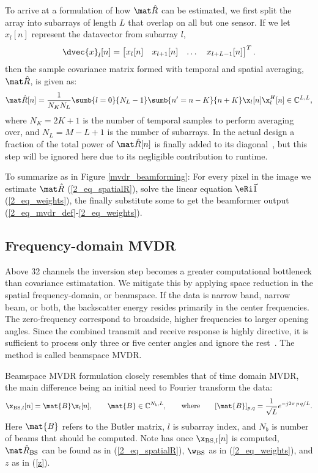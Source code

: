 {To arrive at a formulation of how $\eR$ can be estimated, we first split the array into subarrays of length $L$ that overlap on all but one sensor. If we let $x_l[n]$ represent the datavector from subarray $l$,
%
\begin{gather}
\dvec{x}_l[n] = \bmat{x_l[n] & x_{l+1}[n] & \dots & x_{l+L-1}[n]}^T.
\end{gather}
%
then the sample covariance matrix formed with temporal and spatial averaging, $\eR$, is given as:
%
\begin{gather}
\eR[n] =  \frac{1}{N_K N_L} \sumb{l=0}{N_L-1}\sumb{n'=n-K}{n+K} \x_l[n]\x_l^H[n] \in\mathbb{C}^{L,L},\label{2_eq_spatialR}
\end{gather}
%
where $N_K = 2K+1$ is the number of temporal samples to perform averaging over, and $N_L = M-L+1$ is the number of subarrays. In the actual design a fraction of the total power of $\eR[n]$ is finally added to its diagonal~\cite{Synnevag2007}, but this step will be ignored here due to its negligible contribution to runtime.

To summarize as in Figure \ref{mvdr_beamforming}: For every pixel in the image we estimate $\eR$ (\ref{2_eq_spatialR}), solve the linear equation $\eRi\1$ (\ref{2_eq_weights}), the finally substitute some to get the beamformer output (\ref{2_eq_mvdr_def}-\ref{2_eq_weights}).



\subsection{Frequency-domain MVDR}

Above 32 channels the inversion step becomes a greater computational bottleneck than covariance estimatation. We mitigate this by applying space reduction in the spatial frequency-domain, or beamspace. If the data is narrow band, narrow beam, or both, the backscatter energy resides primarily in the center frequencies. The zero-frequency correspond to broadside, higher frequencies to larger opening angles. Since the combined transmit and receive response is highly directive, it is sufficient to process only three or five center angles and ignore the rest~\cite{Nilsen2009a,VanTrees2002}. The method is called beamspace MVDR.

Beamspace MVDR formulation closely resembles that of time domain MVDR, the main difference being an initial need to Fourier transform the data:
%
\begin{gather}
\x_{\text{BS},l}[n] = \mat{B}\x_l[n], \qquad \mat{B}\in \mathbb{C}^{N_b,L}, \qquad \text{where} \qquad [\mat{B}]_{p,q} = \frac{1}{\sqrt{L}} e^{-j2\pi\,p\,q/L}.\label{2_eq_beamspace}
\end{gather}
%
Here $\mat{B}$ refers to the Butler matrix, $l$ is subarray index, and $N_b$ is number of beams that should be computed. Note has once $\x_{\text{BS},l}[n]$ is computed, $\eR_\text{BS}$ can be found as in (\ref{2_eq_spatialR}), $\w_\text{BS}$ as in (\ref{2_eq_weights}), and $z$ as in (\ref{z}).

}
